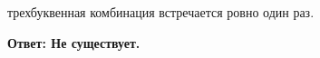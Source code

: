 \documentclass[a4paper,12pt]{article}
\begin{document}
трехбуквенная комбинация встречается ровно один раз.

\textbf{Ответ: Не существует.}
\end{document}
